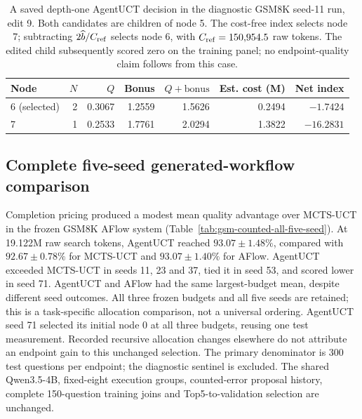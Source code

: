 \begin{table}[t]
\centering
\caption{A saved depth-one AgentUCT decision in the diagnostic GSM8K
seed-11 run, edit 9. Both candidates are children of node 5. The cost-free
index selects node 7; subtracting $2\widehat b/C_{\rm ref}$ selects node 6,
with $C_{\rm ref}=150{,}954.5$ raw tokens. The edited child subsequently scored
zero on the training panel; no endpoint-quality claim follows from this case.}
\label{tab:gsm-nonroot-choice}
\small
\begin{tabular}{lrrrrrr}
\toprule
Node & $N$ & $Q$ & Bonus & $Q+\mathrm{bonus}$ & Est. cost (M) & Net index\\
\midrule
6 (selected) & 2 & 0.3067 & 1.2559 & 1.5626 & 0.2494 & $-1.7424$\\
7 & 1 & 0.2533 & 1.7761 & 2.0294 & 1.3822 & $-16.2831$\\
\bottomrule
\end{tabular}
\end{table}

\subsection{Complete five-seed generated-workflow comparison}
\label{sec:gsm-five-seed-complete}
Completion pricing produced a modest mean quality advantage over MCTS-UCT
in the frozen GSM8K AFlow system (Table~\ref{tab:gsm-counted-all-five-seed}).
At 19.122M raw search tokens, AgentUCT reached $93.07\pm1.48\%$,
compared with $92.67\pm0.78\%$ for MCTS-UCT and
$93.07\pm1.40\%$ for AFlow. AgentUCT exceeded MCTS-UCT
in seeds 11, 23 and 37, tied it in seed 53, and scored lower in seed 71.
AgentUCT and AFlow had the same largest-budget mean, despite different
seed outcomes. All three frozen budgets and all five seeds are retained;
this is a task-specific allocation comparison, not a universal ordering.
AgentUCT seed 71 selected its initial node 0 at all three budgets, reusing
one test measurement. Recorded recursive allocation changes elsewhere do not
attribute an endpoint gain to this unchanged selection.
The primary denominator is 300 test questions per endpoint; the diagnostic
sentinel is excluded. The shared Qwen3.5-4B, fixed-eight execution groups,
counted-error proposal history, complete 150-question training joins and
Top5-to-validation selection are unchanged.

